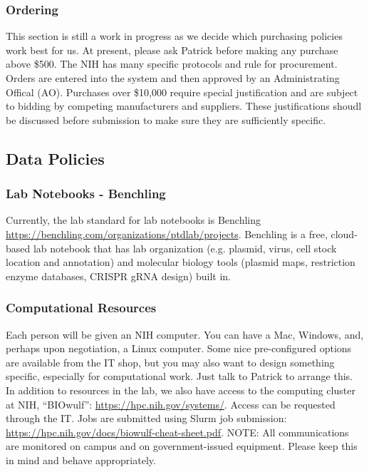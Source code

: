 \documentclass[10pt, a4paper, twocolumn]{article} %
\begin{document}
\subsubsection{Ordering}
 This section is still a work in progress as we decide which purchasing policies work best for us. At present, please ask Patrick before making any purchase above \$500. The NIH has many specific protocols and rule for procurement. Orders are entered into the system and then approved by an Administrating Offical (AO). Purchases over \$10,000 require special justification and are subject to bidding by competing manufacturers and suppliers. These justifications shoudl be discussed before submission to make sure they are sufficiently specific.

\subsection{Data Policies}

\subsubsection{Lab Notebooks - Benchling}
Currently, the lab standard for lab notebooks is Benchling \href{https://benchling.com/organizations/ptdlab/projects}{https://benchling.com/organizations/ptdlab/projects}. Benchling is a free, cloud-based lab notebook that has lab organization (e.g. plasmid, virus, cell stock location and annotation) and molecular biology tools (plasmid maps, restriction enzyme databases, CRISPR gRNA design) built in.

\subsubsection{Computational Resources}
Each person will be given an NIH computer. You can have a Mac, Windows, and, perhaps upon negotiation, a Linux computer. Some nice pre-configured options are available from the IT shop, but you may also want to design something specific, especially for computational work. Just talk to Patrick to arrange this.
In addition to resources in the lab, we also have access to the computing cluster at NIH, “BIOwulf”: \href{https://hpc.nih.gov/systems/}{https://hpc.nih.gov/systems/}. Access can be requested through the IT. Jobs are submitted using Slurm job submission: \href{https://hpc.nih.gov/docs/biowulf-cheat-sheet.pdf}{https://hpc.nih.gov/docs/biowulf-cheat-sheet.pdf}.
\newline
NOTE: All communications are monitored on campus and on government-issued equipment. Please keep this in mind and behave appropriately.
\end{document}
